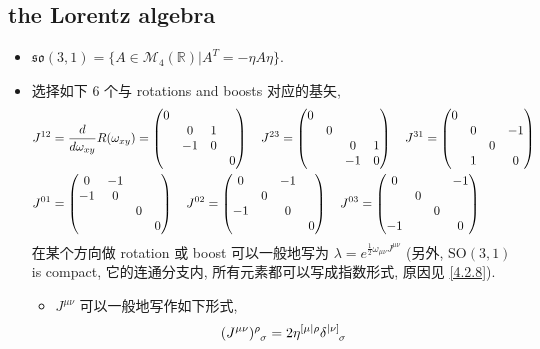 \subsection{the Lorentz algebra}
\begin{itemize}
	\item $\mathfrak{so}(3, 1) = \{A \in \mathcal{M}_4(\mathbb{R}) | A^T = - \eta A \eta\}$.
	
	\item 选择如下 6 个与 rotations and boosts 对应的基矢,
	\begin{align}
		& J^{1 2} = \frac{d}{d\omega_{x y}} R(\omega_{x y}) = \begin{pmatrix}
			0 & & & \\
			& 0 & 1 & \\
			& - 1 & 0 & \\
			& & & 0
		\end{pmatrix} \quad J^{2 3} = \begin{pmatrix}
			0 & & & \\
			& 0 & & \\
			& & 0 & 1 \\
			& & - 1 & 0
		\end{pmatrix} \quad J^{3 1} = \begin{pmatrix}
			0 & & & \\
			& 0 & & - 1 \\
			& & 0 & \\
			& 1 & & 0
		\end{pmatrix} \notag \\
		& J^{0 1} = \begin{pmatrix}
			0 & - 1 & & \\
			- 1 & 0 & & \\
			& & 0 & \\
			& & & 0
		\end{pmatrix} \quad J^{0 2} = \begin{pmatrix}
			0 & & - 1 & \\
			& 0 & & \\
			- 1 & & 0 & \\
			& & & 0
		\end{pmatrix} \quad J^{0 3} = \begin{pmatrix}
			0 & & & - 1 \\
			& 0 & & \\
			& & 0 & \\
			- 1 & & & 0
		\end{pmatrix}
	\end{align}
	在某个方向做 rotation 或 boost 可以一般地写为 $\lambda = e^{\frac{1}{2} \omega_{\mu \nu} J^{\mu \nu}}$ (另外, $\mathrm{SO}(3, 1)$ is compact, 它的连通分支内, 所有元素都可以写成指数形式, 原因见 \eqref{4.2.8}).
	\begin{itemize}
		\item $J^{\mu \nu}$ 可以一般地写作如下形式,
		\begin{equation}
			\tensor{(J^{\mu \nu})}{^\rho_\sigma} = 2 \eta^{[\mu| \rho} \tensor{\delta}{^{|\nu]}_\sigma}
		\end{equation}
		

\end{itemize}
\end{itemize}
